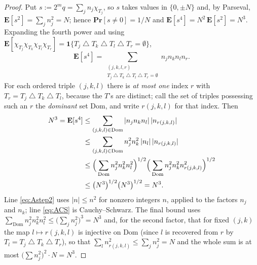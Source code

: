 \documentclass[11pt,reqno]{amsart}
\theoremstyle{plain}
\theoremstyle{definition}
\numberwithin{theorem}{section}
\newcommand{\Ex}{\mathbf{E}}
\newcommand{\Prb}{\mathbf{Pr}}
\newcommand{\sd}{\mathbin{\triangle}}
\begin{document}
\begin{proof}
Put $s := 2^m q = \sum_j n_j \chi_{T_j}$, so $s$ takes values in $\{0, \pm N\}$ and, by
Parseval, $\Ex[s^2] = \sum_j n_j^2 = N$; hence $\Prb[s \ne 0] = 1/N$ and
$\Ex[s^4] = N^2\,\Ex[s^2] = N^3$. Expanding the fourth power and using
$\Ex[\chi_{T_j}\chi_{T_k}\chi_{T_l}\chi_{T_r}] = \mathbf{1}\{T_j \sd T_k \sd T_l \sd T_r =
\emptyset\}$,
\[
  \Ex[s^4] = \sum_{\substack{(j,k,l,r) \\ T_j \sd T_k \sd T_l \sd T_r = \emptyset}}
  n_j n_k n_l n_r .
\]
For each ordered triple $(j,k,l)$ there is \emph{at most one} index $r$ with
$T_r = T_j \sd T_k \sd T_l$, because the $T$'s are distinct; call the set of triples possessing
such an $r$ the \emph{dominant} set $\mathrm{Dom}$, and write $r(j,k,l)$ for that index. Then
\begin{align}
  N^3 = \Ex[s^4]
  &\le \sum_{(j,k,l) \in \mathrm{Dom}} |n_j n_k n_l|\,|n_{r(j,k,l)}| \notag \\
  &\le \sum_{(j,k,l) \in \mathrm{Dom}} n_j^2 n_k^2\, |n_l|\,|n_{r(j,k,l)}|
    \label{eq:Astep2} \\
  &\le \Big( \sum_{\mathrm{Dom}} n_j^2 n_k^2 n_l^2 \Big)^{1/2}
       \Big( \sum_{\mathrm{Dom}} n_j^2 n_k^2 n_{r(j,k,l)}^2 \Big)^{1/2}
    \label{eq:ACS} \\
  &\le \big( N^3 \big)^{1/2}\big( N^3 \big)^{1/2} = N^3 . \notag
\end{align}
Line \eqref{eq:Astep2} uses $|n| \le n^2$ for nonzero integers $n$, applied to the factors
$n_j$ and $n_k$; line \eqref{eq:ACS} is Cauchy--Schwarz. The final bound uses
$\sum_{\mathrm{Dom}} n_j^2 n_k^2 n_l^2 \le \big(\sum_j n_j^2\big)^3 = N^3$ and, for the second
factor, that for fixed $(j,k)$ the map $l \mapsto r(j,k,l)$ is injective on $\mathrm{Dom}$
(since $l$ is recovered from $r$ by $T_l = T_j \sd T_k \sd T_r$), so that
$\sum_l n_{r(j,k,l)}^2 \le \sum_j n_j^2 = N$ and the whole sum is at most
$\big(\sum n_j^2\big)^2 \cdot N = N^3$.


\end{proof}
\end{document}
